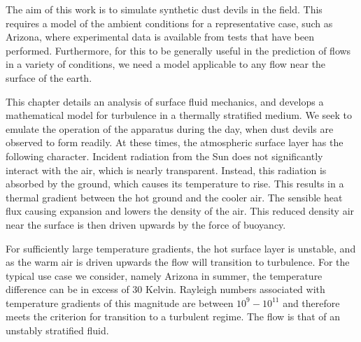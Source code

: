 \label{sec:mathmodel}


%
%

The aim of this work is to simulate synthetic
dust devils in the field. This requires a model of the ambient
conditions for a representative case, such as Arizona, where
experimental data is available from tests that have been
performed. Furthermore, for this to be generally useful in the
prediction of flows in a variety of conditions, we need a model
applicable to any flow near the surface of the earth.  

This chapter details an analysis of surface fluid mechanics, and
develops a mathematical model for turbulence in a thermally stratified
medium. We seek to emulate the operation of the apparatus during the
day, when dust devils are observed to form readily. 
At these times, the atmospheric surface layer has the following
character. Incident radiation from the Sun does not significantly
interact with the air, which is nearly
transparent\cite{haltiner1957dynamical}. Instead, this radiation is
absorbed by the ground, which causes its temperature to rise. This
results in a thermal gradient between the hot ground and the cooler
air. The sensible heat flux causing expansion and lowers the density
of the air. This reduced density air near the surface is then driven
upwards by the force of buoyancy.    

For sufficiently large temperature gradients, the hot surface layer is
unstable, and as the warm air is driven upwards the flow will transition
to turbulence. For the typical use case we consider, namely Arizona in
summer, the temperature difference can be in excess of 30 Kelvin. 
Rayleigh numbers associated with temperature gradients of this magnitude
are between $10^{9} - 10^{11}$ and therefore meets the
criterion\cite{incropera1996fundamentals}  
for transition to a turbulent regime. The flow is that of an unstably
stratified fluid.  

